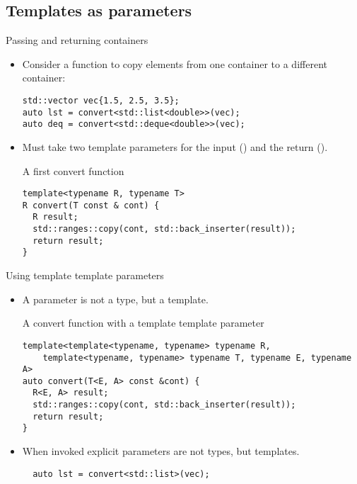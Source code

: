 \subsection{Templates as parameters}

\begin{frame}[t,fragile]{Passing and returning containers}
\begin{itemize}
  \item Consider a function  to copy elements from one container
        to a different container:
\begin{lstlisting}
std::vector vec{1.5, 2.5, 3.5};
auto lst = convert<std::list<double>>(vec);
auto deq = convert<std::deque<double>>(vec);
\end{lstlisting}

  \item Must take two template parameters for the input () and the return ().
\begin{block}{A first convert function}
\begin{lstlisting}
template<typename R, typename T>
R convert(T const & cont) {
  R result;
  std::ranges::copy(cont, std::back_inserter(result));
  return result;
}
\end{lstlisting}
\end{block}
  
\end{itemize}
\end{frame}

\begin{frame}[t,fragile]{Using template template parameters}
\begin{itemize}
  \item A  parameter is not a type, but a template.
\begin{block}{A convert function with a template template parameter}
\begin{lstlisting}
template<template<typename, typename> typename R,
    template<typename, typename> typename T, typename E, typename A>
auto convert(T<E, A> const &cont) {
  R<E, A> result;
  std::ranges::copy(cont, std::back_inserter(result));
  return result;
}
\end{lstlisting}
\end{block}

  \item When invoked explicit parameters are not types, but templates.
\begin{lstlisting}
  auto lst = convert<std::list>(vec);
\end{lstlisting}
\end{itemize}
\end{frame}

